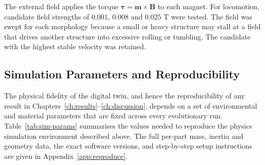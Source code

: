 \documentclass[12pt,a4paper]{report}
\begin{document}
The external field applies the torque $\boldsymbol{\tau}=\mathbf{m}\times\mathbf{B}$ to each magnet. For locomotion, candidate field strengths of $0.001$, $0.008$ and $0.025$ T were tested. The field was swept for each morphology because a small or heavy structure may stall at a field that drives another structure into excessive rolling or tumbling. The candidate with the highest stable velocity was retained.

\subsection{Simulation Parameters and Reproducibility}
\label{sec:sim-params}
The physical fidelity of the digital twin, and hence the reproducibility of any result in Chapters~\ref{ch:results}--\ref{ch:discussion}, depends on a set of environmental and material parameters that are fixed across every evolutionary run. Table~\ref{tab:sim-params} summarises the values needed to reproduce the physics simulation environment described above. The full per-part mass, inertia and geometry data, the exact software versions, and step-by-step setup instructions are given in Appendix~\ref{app:reproduce}.
\end{document}
